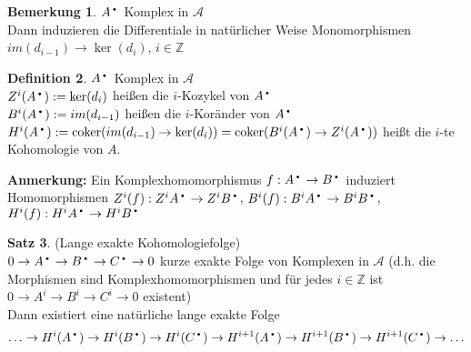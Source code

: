 \documentclass[10pt,a4paper,numbers=endperiod]{scrreprt}
\DeclareMathOperator{\coker}{coker}
\theoremstyle{definition}
\newtheorem{satz}{Satz}[section]
\newtheorem{defi}[satz]{Definition}
\newtheorem{bem}[satz]{Bemerkung}
\newcommand{\point}{\text{\textbullet}}
\def\ZZ{{\mathbb Z}}
\begin{document}
\begin{bem}
	$A^\point$ Komplex in $\mathcal{A}$\\
	Dann induzieren die Differentiale in natürlicher Weise Monomorphismen $im(d_{i-1}) \to \ker(d_i)$, $i \in \ZZ$
\end{bem}

\begin{defi}
	$A^\point$ Komplex in $\mathcal{A}$\\
	$Z^i(A^\point) := \ker(d_i)$ heißen die $i$-Kozykel von $A^\point$\\
	$B^i(A^\point) := im(d_{i-1})$ heißen die $i$-Koränder von $A^\point$\\
	$H^i(A^\point) := \coker(im(d_{i-1}) \to \ker (d_i)) = \coker(B^i(A^\point) \to Z^i(A^\point))$ heißt die $i$-te Kohomologie von $A$.
\end{defi}

\textbf{Anmerkung:} Ein Komplexhomomorphismus $f: A^\point \to B^\point$ induziert Homomorphismen $Z^i(f): Z^i A^\point \to Z^i B^\point$, $B^i(f): B^iA^\point \to B^i B^\point$, $H^i(f): H^i A^\point \to H^i B^\point$ 

\begin{satz}
	(Lange exakte Kohomologiefolge)\\
	$0 \to A^\point \to B^\point \to C^\point \to 0$ kurze exakte Folge von Komplexen in $\mathcal{A}$ (d.h. die Morphismen sind Komplexhomomorphismen und für jedes $i \in \ZZ$ ist $0 \to A^i \to B^i \to C^i \to 0$ existent)\\
	Dann existiert eine natürliche lange exakte Folge \begin{align*}
	\ldots \to H^i(A^\point) \to H^i(B^\point) \to H^i(C^\point) \to H^{i+1}(A^\point) \to H^{i+1}(B^\point) \to H^{i+1}(C^\point) \to \ldots
	\end{align*}
\end{satz}
\end{document}
